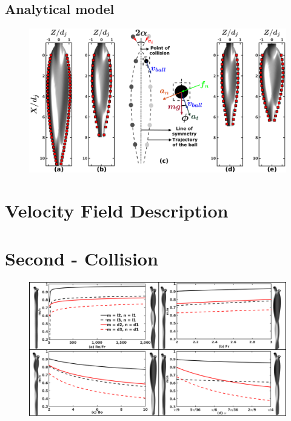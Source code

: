 \documentclass[%
aip,
sd,%
amsmath,amssymb,
preprint,%
author-year,%
]{revtex4-1}
\begin{document}
\subsection{Analytical model}
\lipsum[1]
\begin{figure}
	\centering
	\includegraphics[width=\linewidth]{analytical}
	\caption{}
	\label{Figure::analytical}
\end{figure}
\lipsum[1]
\section{Velocity Field Description}
\lipsum[1]
\section{Second - Collision}
\begin{figure}[H]
	\centering
	\includegraphics[width=\linewidth]{lil1did1}
	\caption{}
	\label{Figure::lil1}
\end{figure}
\lipsum[1]
\end{document}
